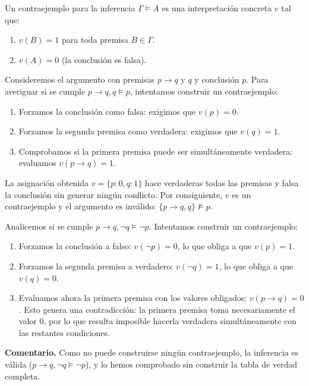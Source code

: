 \begin{definition}[Contraejemplo]
Un contraejemplo para la inferencia $\Gamma \models A$ es una interpretación concreta $v$ tal que:
\begin{enumerate}
    \item $v(B) = 1$ para toda premisa $B \in \Gamma$.
    \item $v(A) = 0$ (la conclusión es falsa).
\end{enumerate}
\end{definition}


\begin{ejemplo}
Consideremos el argumento con premisas $p \to q$ y $q$ y conclusión $p$. Para averiguar si se cumple $p \to q, q \models p$, intentamos construir un contraejemplo:
\begin{enumerate}
    \item Forzamos la conclusión como falsa: exigimos que $v(p) = 0$.
    \item Forzamos la segunda premisa como verdadera: exigimos que $v(q) = 1$.
    \item Comprobamos si la primera premisa puede ser simultáneamente verdadera: evaluamos $v(p \to q) = 1$.
\end{enumerate}
La asignación obtenida $v = \{p: 0, q: 1\}$ hace verdaderas todas las premisas y falsa la conclusión sin generar ningún conflicto. Por consiguiente, $v$ es un contraejemplo y el argumento es inválido: $\{p \to q, q\} \not\models p$.
\end{ejemplo}

\begin{ejemplo}
Analicemos si se cumple $p \to q, \neg q \models \neg p$.
Intentamos construir un contraejemplo:
\begin{enumerate}
    \item Forzamos la conclusión a falso: $v(\neg p) = 0$, lo que obliga a que $v(p) = 1$.
    \item Forzamos la segunda premisa a verdadero: $v(\neg q) = 1$, lo que obliga a que $v(q) = 0$.
    \item Evaluamos ahora la primera premisa con los valores
      obligados: $v(p \to q) =  0$.
    Esto genera una contradicción: la primera premisa toma necesariamente el valor $0$, por lo que resulta imposible hacerla verdadera simultáneamente con las restantes condiciones.
\end{enumerate}
\textbf{Comentario.} Como no puede construirse ningún contraejemplo, la inferencia es válida ($p \to q, \neg q \models \neg p$), y lo hemos comprobado sin construir la tabla de verdad completa.
\end{ejemplo}

